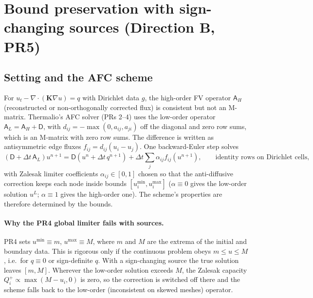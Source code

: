 \documentclass[11pt]{article}
\numberwithin{equation}{section}
\theoremstyle{remark}
\newcommand{\Dm}{\mathsf{D}}
\begin{document}
\tableofcontents

\section{Bound preservation with sign-changing sources (Direction B, PR5)}

\subsection{Setting and the AFC scheme}

For $u_t-\nabla\cdot(\bm K\nabla u)=q$ with Dirichlet data $g$, the high-order
FV operator $\mathsf A_H$ (reconstructed or non-orthogonally corrected flux) is
consistent but not an M-matrix.  Thermalio's AFC solver (PRs 2--4) uses the
low-order operator $\mathsf A_L=\mathsf A_H+\mathsf D$, with
$d_{ij}=-\max(0,a_{ij},a_{ji})$ off the diagonal and zero row sums, which is an
M-matrix with zero row sums.  The difference is written as antisymmetric edge
fluxes $f_{ij}=d_{ij}(u_i-u_j)$.  One backward-Euler step solves
\begin{equation}
  (\Dm+\Delta t\,\mathsf A_L)u^{n+1}
  = \Dm(u^n+\Delta t\,q^{n+1}) + \Delta t\sum_j \alpha_{ij}f_{ij}(u^{n+1}),
  \qquad \text{identity rows on Dirichlet cells},
  \label{eq:afc}
\end{equation}
with Zalesak limiter coefficients $\alpha_{ij}\in[0,1]$ chosen so that the
anti-diffusive correction keeps each node inside bounds
$[u_i^{\min},u_i^{\max}]$ ($\alpha\equiv0$ gives the low-order solution
$u^L$; $\alpha\equiv1$ gives the high-order one).  The scheme's properties
are therefore determined by the bounds.

\paragraph{Why the PR4 global limiter fails with sources.}  PR4 sets
$u^{\min}\equiv m$, $u^{\max}\equiv M$, where $m$ and $M$ are the extrema of the
initial and boundary data.  This is rigorous only if the continuous problem
obeys $m\le u\le M$, i.e.\ for $q\equiv0$ or sign-definite $q$.  With a
sign-changing source the true solution leaves $[m,M]$.  Wherever the low-order
solution exceeds $M$, the Zalesak capacity $Q_i^+\propto\max(M-u_i,0)$ is
zero, so the correction is switched off there and the scheme falls back to the
low-order (inconsistent on skewed meshes) operator.
\end{document}
